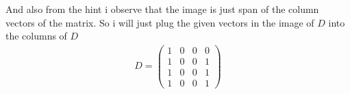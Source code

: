\documentclass{article}
\begin{document}
And also from the hint i observe that the image is just span of the column vectors of the matrix. So i will just plug the given vectors in the image of \(D\)
into the columns of \(D\)
\begin{align*}
D = \begin{pmatrix}
1 & 0 & 0 & 0 \\
1 & 0 & 0 & 1 \\
1 & 0 & 0 & 1 \\
1 & 0 & 0 & 1
\end{pmatrix}
\end{align*}
\end{document}
